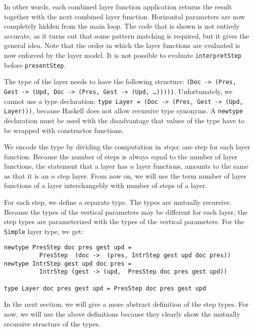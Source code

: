 In other words, each combined layer function application returns the result together with the next combined layer function. Horizontal parameters are now completely hidden from the main loop. The code that is shown is not entirely accurate, as it turns out that some pattern matching is required, but it gives the general idea. Note that the order in which the layer functions are evaluated is now enforced by the layer model. It is not possible to evaluate \texttt{interpretStep} before \texttt{presentStep}.


The type of the layer needs to have the following structure: \texttt{(Doc -> (Pres, Gest -> (Upd, Doc -> (Pres, Gest -> (Upd, \dots)))))}. Unfortunately, we cannot use a type declaration: \texttt{type Layer = (Doc -> (Pres, Gest -> (Upd, Layer)))}, because Haskell does not allow recursive type synonyms. A \texttt{newtype} declaration must be used with the disadvantage that values of the type have to be wrapped with constructor functions.

We encode the type by dividing the computation in {\em steps}; one step for each layer function. Because the number of steps is always equal to the number of layer functions, the statement that a layer has $n$ layer functions, amounts to the same as that it is an $n$ step layer. From now on, we will use the term number of layer functions of a layer interchangebly with number of steps of a layer.

For each step, we define a separate type. The types are mutually recursive. Because the types of the vertical parameters may be different for each layer, the step types are parameterized with the types of the vertical parameters. For the \texttt{Simple} layer type, we get:

\begin{small}
\begin{verbatim}
newtype PresStep doc pres gest upd = 
          PresStep  (doc ->  (pres, IntrStep gest upd doc pres))
newtype IntrStep gest upd doc pres = 
          IntrStep (gest -> (upd,  PresStep doc pres gest upd)) 

type Layer doc pres gest upd = PresStep doc pres gest upd
\end{verbatim}
\end{small}

In the next section, we will give a more abstract definition of the step types. For now, we will use the above definitions because they clearly show the mutually recursive structure of the types. 

